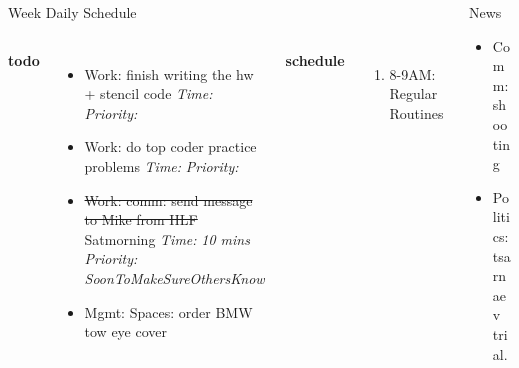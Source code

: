 \documentclass[serif, mathserif, final]{beamer}
\newcommand{\doneTask}[1]{\tiny \item \tiny \sout{#1}}
\newcommand{\timeEst}[1]{\textit{Time:} \textit{#1}}
\newcommand{\priority}[1]{\textit{Priority:} \textit{#1}}
\newcommand{\deadline}[1]{#1}
\begin{document}
\begin{frame}{}
\begin{columns}
\begin{column}{0.50\linewidth}
\begin{block}{Week Daily Schedule}
\begin{columns}
  \textbf{\small todo}\\
  \begin{itemize} 
    \tiny \item \tiny Work: finish writing the hw + stencil code \deadline{ }
    \timeEst{}  \priority{} 
    \tiny \item \tiny Work: do top coder practice problems \deadline{}   \timeEst{}  \priority{} 
   \doneTask{Work: comm: send message to Mike from HLF} \deadline{Satmorning }   \timeEst{10 mins}
   \priority{SoonToMakeSureOthersKnow} 
   \tiny \item \tiny Mgmt: Spaces: order BMW tow eye cover 
  \end{itemize} 
  \textbf{\small schedule}\\ 
  \begin{enumerate} 
    \tiny \item \tiny 8-9AM: Regular Routines 
  \end{enumerate}

  \textbf{\small todo}\\
  \begin{itemize} 
    \tiny \item \tiny Work: top coder practice problems \timeEst{8
      hours}  \priority{High} 

    \tiny \item \tiny Comm: graduation party  \timeEst{30} \deadline{} \priority{}
  \end{itemize}
  \textbf{\small schedule}\\ 
  \begin{enumerate} 
    \tiny \item \tiny 
  \end{enumerate} 
    \end{columns}
  \end{block} 

\end{column}%

\begin{column}{0.20\linewidth}
\begin{block}{News}
  \begin{itemize} 
    \tiny \item \tiny Comm: shooting
  \item \tiny Politics: tsarnaev trial.
  \end{itemize}
\end{block}
  

\end{column}
\end{columns}
\end{frame}
\end{document}

